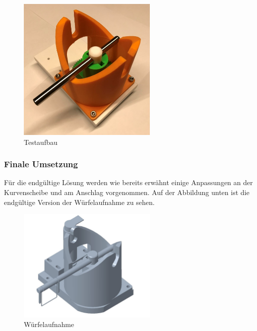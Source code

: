 \documentclass[../../main.tex]{subfiles}
\begin{document}
        \begin{figure}[H]
            \centering
            \includegraphics[width=0.6\textwidth]{Kran/Testaufbau.JPG}
            \caption {Testaufbau}
        \end{figure}
        
        \subsubsection{Finale Umsetzung}
        Für die endgültige Lösung werden wie bereits erwähnt einige Anpassungen an der Kurvenscheibe und am Anschlag vorgenommen. Auf der Abbildung unten ist die endgültige Version der Würfelaufnahme zu sehen. 
        \begin{figure}[H]
            \centering
            \includegraphics[width=0.6\textwidth]{WuerfelaufnahmeBG.JPG}
            \caption {Würfelaufnahme}
        \end{figure}
\end{document}
